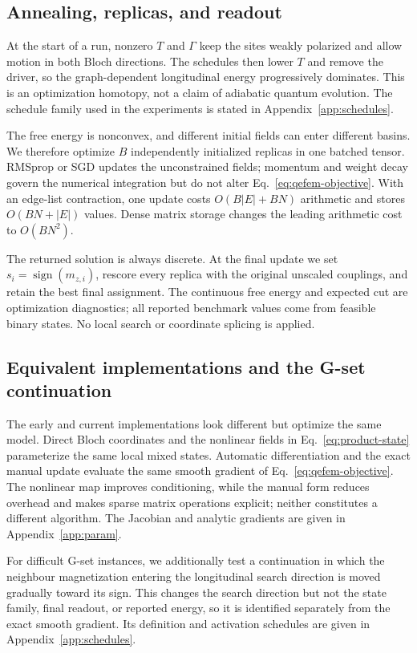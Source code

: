 \documentclass[
  aps,
  prx,
  reprint,
  amsmath,
  amssymb,
  groupedaddress,
  nofootinbib,
  floatfix,
  longbibliography
]{revtex4-2}
\newcommand{\sign}{\operatorname{sign}}
\begin{document}
\subsection{Annealing, replicas, and readout}

At the start of a run, nonzero $T$ and $\Gamma$ keep the sites weakly polarized and allow
motion in both Bloch directions.  The schedules then lower $T$ and remove the
driver, so the graph-dependent longitudinal energy progressively dominates.
This is an optimization homotopy, not a claim of adiabatic quantum evolution.
The schedule family used in the experiments is stated in
Appendix~\ref{app:schedules}.

The free energy is nonconvex, and different initial fields can enter different
basins.  We therefore optimize $B$ independently initialized replicas in one
batched tensor.  RMSprop or SGD updates the unconstrained fields; momentum and
weight decay govern the numerical integration but do not alter
Eq.~\eqref{eq:qefem-objective}.  With an edge-list contraction, one update
costs $O(B|E|+BN)$ arithmetic and stores $O(BN+|E|)$ values.  Dense matrix
storage changes the leading arithmetic cost to $O(BN^2)$.

The returned solution is always discrete.  At the final update we set
$s_i=\sign(m_{z,i})$, rescore every replica with the original unscaled
couplings, and retain the best final assignment.  The continuous free energy
and expected cut are optimization diagnostics; all reported benchmark values
come from feasible binary states.  No local search or coordinate splicing is
applied.

\subsection{Equivalent implementations and the G-set continuation}

The early and current implementations look different but optimize the same
model.  Direct Bloch coordinates and the nonlinear fields in
Eq.~\eqref{eq:product-state} parameterize the same local mixed states.
Automatic differentiation and the exact manual update evaluate the same
smooth gradient of Eq.~\eqref{eq:qefem-objective}.  The nonlinear map improves
conditioning, while the manual form reduces overhead and makes sparse matrix
operations explicit; neither constitutes a different algorithm.  The
Jacobian and analytic gradients are given in Appendix~\ref{app:param}.

For difficult G-set instances, we additionally test a continuation in which
the neighbour magnetization entering the longitudinal search direction is
moved gradually toward its sign.  This changes the search direction but not
the state family, final readout, or reported energy, so it is identified
separately from the exact smooth gradient.  Its definition and activation
schedules are given in Appendix~\ref{app:schedules}.
\end{document}
